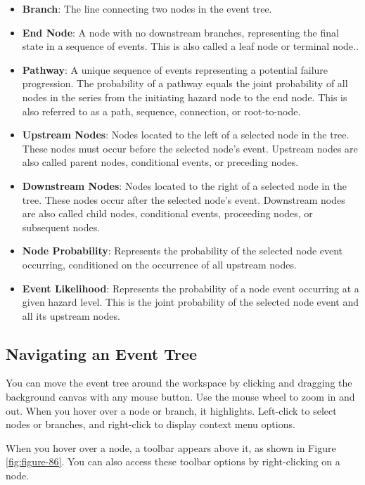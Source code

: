 \documentclass[
]{book}
\begin{document}
\begin{itemize}
\begin{itemize}
  \end{itemize}
\item
  \textbf{Branch}: The line connecting two nodes in the event tree.
\item
  \textbf{End Node}: A node with no downstream branches, representing the final state in a sequence of events. This is also called a leaf node or terminal node..
\item
  \textbf{Pathway}: A unique sequence of events representing a potential failure progression. The probability of a pathway equals the joint probability of all nodes in the series from the initiating hazard node to the end node. This is also referred to as a path, sequence, connection, or root-to-node.
\item
  \textbf{Upstream Nodes}: Nodes located to the left of a selected node in the tree. These nodes must occur before the selected node's event. Upstream nodes are also called parent nodes, conditional events, or preceding nodes.
\item
  \textbf{Downstream Nodes}: Nodes located to the right of a selected node in the tree. These nodes occur after the selected node's event. Downstream nodes are also called child nodes, conditional events, proceeding nodes, or subsequent nodes.
\item
  \textbf{Node Probability}: Represents the probability of the selected node event occurring, conditioned on the occurrence of all upstream nodes.
\item
  \textbf{Event Likelihood}: Represents the probability of a node event occurring at a given hazard level. This is the joint probability of the selected node event and all its upstream nodes.
\end{itemize}

\hypertarget{navigating-an-event-tree}{%
\subsection{Navigating an Event Tree}\label{navigating-an-event-tree}}

You can move the event tree around the workspace by clicking and dragging the background canvas with any mouse button. Use the mouse wheel to zoom in and out. When you hover over a node or branch, it highlights. Left-click to select nodes or branches, and right-click to display context menu options.

When you hover over a node, a toolbar appears above it, as shown in Figure \ref{fig:figure-86}. You can also access these toolbar options by right-clicking on a node.
\end{document}
